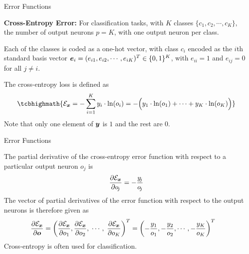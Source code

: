 \begin{frame}{Error Functions}

    {\bf Cross-Entropy Error:} For classification tasks, with $K$
        classes $\{c_1, c_2, \cdots, c_K\}$, %
	the number of output neurons $p=K$, with one output neuron 
        per class. 

	\medskip

	Each of
        the classes is coded as a one-hot vector, with class $c_i$
        encoded as the $i$th standard basis vector 
        ${\boldsymbol e}_i  = (e_{i1}, e_{i2}, \cdots, e_{iK})^T \in \{0,1\}^{K}$,
        with $e_{ii}=1$ and $e_{ij} = 0$ for all $j\ne i$. %

	\medskip

	The cross-entropy loss is defined as 
\begin{align*}
    \tcbhighmath{
    \cE_\bx = - \sum_{i=1}^K y_i \cdot \ln(o_i) = 
    - \Bigl( y_1 \cdot \ln(o_1) + \cdots 
+ y_K \cdot \ln(o_K) \Bigr) }
\end{align*}
Note that only one element of ${\boldsymbol y}$ is $1$ and the rest are $0$.
\end{frame}

\begin{frame}{Error Functions}

The partial derivative of the cross-entropy error function with
respect to a particular output neuron $o_{\!j}$ is
\begin{align*}
    \frac{\partial {\mathcal E}_{\boldsymbol x}}{\partial o_{\!j}} = 
    -\frac{y_{\!j}}{o_{\!j}}
\end{align*}
The vector of partial derivatives of the error function with respect to
the output neurons
is therefore given as
\begin{align*}
    \frac{\partial{\mathcal E}_{\boldsymbol x}}{\partial {\boldsymbol o}} & = 
    \left(\frac{\partial {\mathcal E}_{\boldsymbol x}}{\partial o_{1}},
        \frac{\partial {\mathcal E}_{\boldsymbol x}}{\partial o_{2}},
    \;\cdots,\; \frac{\partial {\mathcal E}_{\boldsymbol x}}{\partial o_{K}}\right)^T
     = \left( -\frac{y_1}{o_1}, -\frac{y_2}{o_2}, \cdots, 
             -\frac{y_K}{o_K}
    \right)^T
\end{align*}
Cross-entropy is often used for classification.

\end{frame}

